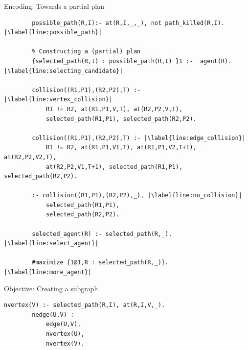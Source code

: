 \begin{frame}[fragile]{Encoding: Towards a partial plan}
    
    \begin{lstlisting}[style=mystyle]
        % Defining collision & possible_path
        possible_path(R,I):- at(R,I,_,_), not path_killed(R,I). |\label{line:possible_path}|
        
        % Constructing a (partial) plan
        {selected_path(R,I) : possible_path(R,I) }1 :-  agent(R). |\label{line:selecting_candidate}|
    
        collision((R1,P1),(R2,P2),T) :- |\label{line:vertex_collision}|
            R1 != R2, at(R1,P1,V,T), at(R2,P2,V,T),
            selected_path(R1,P1), selected_path(R2,P2).
    
        collision((R1,P1),(R2,P2),T) :- |\label{line:edge_collision}|
            R1 != R2, at(R1,P1,V1,T), at(R1,P1,V2,T+1), at(R2,P2,V2,T), 
            at(R2,P2,V1,T+1), selected_path(R1,P1), selected_path(R2,P2).
        
        :- collision((R1,P1),(R2,P2),_), |\label{line:no_collision}|
            selected_path(R1,P1), 
            selected_path(R2,P2).
    
        selected_agent(R) :- selected_path(R,_).  |\label{line:select_agent}|    
    
        #maximize {1@1,R : selected_path(R,_)}. |\label{line:more_agent}|
    \end{lstlisting}
    \end{frame}
    
    
    \begin{frame}[fragile]{Objective: Creating a subgraph}
    \begin{lstlisting}[style=small]
        nvertex(V) :- selected_path(R,I), at(R,I,V,_).
        nedge(U,V) :- 
            edge(U,V), 
            nvertex(U), 
            nvertex(V).
    \end{lstlisting}
    \end{frame}




